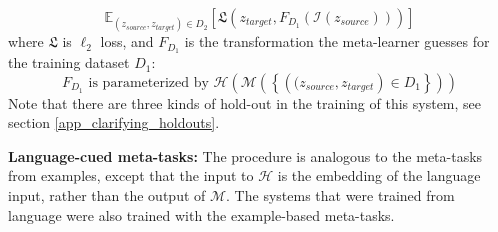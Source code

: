 \[\mathbb{E}_{(z_{source}, z_{target})\in {D}_2} \left[ \mathfrak{L}\left(z_{target}, F_{D_1}\left(\mathcal{I} \left(z_{source}\right)\right) \right)\right]\]
where $\mathfrak{L}$ is $\ell_2$ loss, and $F_{D_1}$ is the transformation the meta-learner guesses for the training dataset $D_1$:
\[F_{D_1} \text{ is parameterized by } \mathcal{H}\left(\mathcal{M}\left( \left\{\left((z_{source},z_{target}\right) \in D_1 \right\}\right)\right)\]
Note that there are three kinds of hold-out in the training of this system, see section \ref{app_clarifying_holdouts}. \par
\textbf{Language-cued meta-tasks:} The procedure is analogous to the meta-tasks from examples, except that the input to $\mathcal{H}$ is the embedding of the language input, rather than the output of $\mathcal{M}$. The systems that were trained from language were also trained with the example-based meta-tasks.\par



